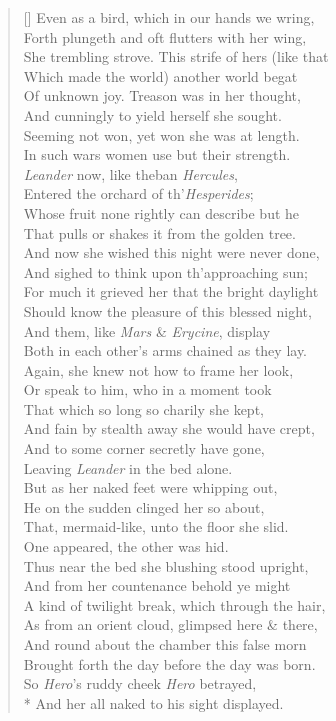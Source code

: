 \documentclass[MAIN]{subfiles}
\begin{document}
\begin{verse}[\versewidth]
Even as a bird, which in our hands we wring,\\
Forth plungeth and oft flutters with her wing,\\
She trembling strove. This strife of hers (like that\\
Which made the world) another world begat\\
Of unknown joy. Treason was in her thought,\\
And cunningly to yield herself she sought.\\
Seeming not won, yet won she was at length.\\
In such wars women use but  their strength.\\
\emph{Leander} now, like theban \emph{Hercules},\\
Entered the orchard of th'\emph{Hesperides};\\
Whose fruit none rightly can describe but he\\
That pulls or shakes it from the golden tree.\\
And now she wished this night were never done,\\
And sighed to think upon th'approaching sun;\\
For much it grieved her that the bright daylight\\
Should know the pleasure of this blessed night,\\
And them, like \emph{Mars} \& \emph{Erycine}, display\\
Both in each other's arms chained as they lay.\\
Again, she knew not how to frame her look,\\
Or speak to him, who in a moment took\\
That which so long so charily she kept,\\
And fain by stealth away she would have crept,\\
And to some corner secretly have gone,\\
Leaving \emph{Leander} in the bed alone.\\
But as her naked feet were whipping out,\\
He on the sudden clinged her so about,\\
That, mermaid-like, unto the floor she slid.\\
One  appeared, the other  was hid.\\
Thus near the bed she blushing stood upright,\\
And from her countenance behold ye might\\
A kind of twilight break, which through the hair,\\
As from an orient cloud, glimpsed here \& there,\\
And round about the chamber this false morn\\
Brought forth the day before the day was born.\\
So \emph{Hero}'s ruddy cheek \emph{Hero} betrayed,\\*
And her all naked to his sight displayed.
\end{verse}
\end{document}
